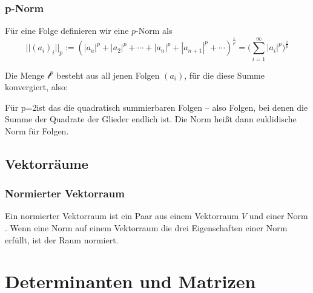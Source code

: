 \documentclass[9pt]{article} %
\begin{document}
\subsubsection{p-Norm}
Für eine Folge definieren wir eine $p$-Norm als 
\[
||(a_i)_i||_p := (|a_a|^p + |a_2|^p+ \cdots + |a_n|^p + |a_{n+1}|^p + \cdots)^{\frac{1}{p}} = \Bigg( \sum^{\infty}_{i=1} |a_i|^p \Bigg)^{\frac{1}{p}}
\]

Die Menge $\mathcal{l}^p$ besteht aus all jenen Folgen $(a_i)$, für die diese Summe konvergiert, also:

Für p=2ist das die quadratisch summierbaren Folgen – also Folgen, bei denen die Summe der Quadrate der Glieder endlich ist. Die Norm heißt dann euklidische Norm für Folgen.

\subsection{Vektorräume}
\subsubsection{Normierter Vektorraum}
Ein normierter Vektorraum ist ein Paar  aus einem Vektorraum $V$ und einer Norm . Wenn eine Norm auf einem Vektorraum die drei Eigenschaften einer Norm erfüllt, ist der Raum normiert.


\color{black}
\section{Determinanten und Matrizen}
\end{document}
